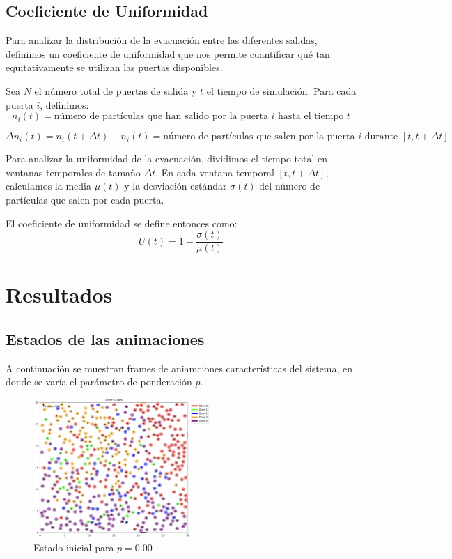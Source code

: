 \documentclass[12pt]{article}
\begin{document}
\subsection{Coeficiente de Uniformidad}

Para analizar la distribución de la evacuación entre las diferentes salidas, definimos un coeficiente de uniformidad que nos permite cuantificar qué tan equitativamente se utilizan las puertas disponibles. 

Sea $N$ el número total de puertas de salida y $t$ el tiempo de simulación. Para cada puerta $i$, definimos:
\[
n_i(t) = \text{número de partículas que han salido por la puerta } i \text{ hasta el tiempo } t
\]

\[
\Delta n_i(t) = n_i(t + \Delta t) - n_i(t) = \text{número de partículas que salen por la puerta } i \text{ durante } [t, t+\Delta t]
\]

Para analizar la uniformidad de la evacuación, dividimos el tiempo total en ventanas temporales de tamaño $\Delta t$. En cada ventana temporal $[t, t+\Delta t]$, calculamos la media $\mu(t)$ y la desviación estándar $\sigma(t)$ del número de partículas que salen por cada puerta.

El coeficiente de uniformidad se define entonces como:
\[
U(t) = 1 - \frac{\sigma(t)}{\mu(t)}
\]


\section{Resultados}

\subsection{Estados de las animaciones}

A continuación se muestran frames de aniamciones características del sistema, en donde se varía el parámetro de ponderación $p$.
\begin{figure}[H]
\centering
\includegraphics[width=0.6\textwidth]{img/frames/t_20_&_p_0.00.jpg}
\caption{Estado inicial para $p=0.00$}
\label{fig:evac_time_ct}
\end{figure}
\end{document}
